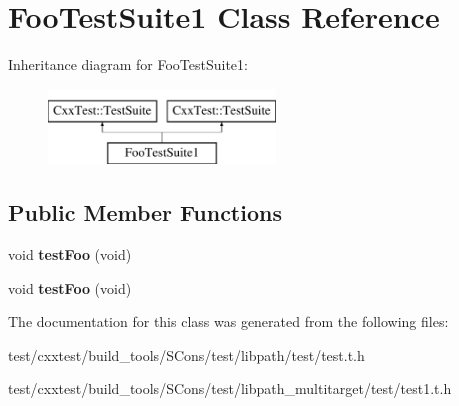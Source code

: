 \hypertarget{classFooTestSuite1}{\section{Foo\-Test\-Suite1 Class Reference}
\label{classFooTestSuite1}
}
Inheritance diagram for Foo\-Test\-Suite1\-:\begin{figure}[H]
\begin{center}
\leavevmode
\includegraphics[height=2.000000cm]{classFooTestSuite1}
\end{center}
\end{figure}
\subsection*{Public Member Functions}
\begin{DoxyCompactItemize}
\item 
\hypertarget{classFooTestSuite1_af2a11d94d9c19582dcf0258557c70efc}{void {\bfseries test\-Foo} (void)}\label{classFooTestSuite1_af2a11d94d9c19582dcf0258557c70efc}

\item 
\hypertarget{classFooTestSuite1_af2a11d94d9c19582dcf0258557c70efc}{void {\bfseries test\-Foo} (void)}\label{classFooTestSuite1_af2a11d94d9c19582dcf0258557c70efc}

\end{DoxyCompactItemize}


The documentation for this class was generated from the following files\-:\begin{DoxyCompactItemize}
\item 
test/cxxtest/build\-\_\-tools/\-S\-Cons/test/libpath/test/test.\-t.\-h\item 
test/cxxtest/build\-\_\-tools/\-S\-Cons/test/libpath\-\_\-multitarget/test/test1.\-t.\-h\end{DoxyCompactItemize}
